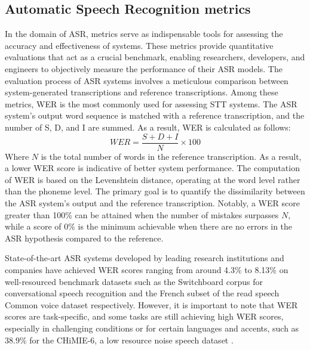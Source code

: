 \subsection{Automatic Speech Recognition metrics}%
In the domain of \ac{ASR}, metrics serve as indispensable tools for assessing the accuracy and effectiveness of systems. These metrics provide quantitative evaluations that act as a crucial benchmark, enabling researchers, developers, and engineers to objectively measure the performance of their \ac{ASR} models. The evaluation process of \ac{ASR} systems involves a meticulous comparison between system-generated transcriptions and reference transcriptions. Among these metrics, \ac{WER} is the most commonly used for assessing \ac{STT} systems. The \ac{ASR} system's output word sequence is matched with a reference transcription, and the number of \ac{S}, \ac{D}, and \ac{I} are summed. As a result, \ac{WER} is calculated as follows:
\begin{equation}
    WER = \frac{S  + D +I}{N} \times 100
\end{equation}
Where $N$ is the total number of words in the reference transcription. As a result, a lower \ac{WER} score is indicative of better system performance. The computation of \ac{WER} is based on the Levenshtein distance, operating at the word level rather than the phoneme level. The primary goal is to quantify the dissimilarity between the \ac{ASR} system's output and the reference transcription. Notably, a \ac{WER} score greater than 100\% can be attained when the number of mistakes surpasses $N$, while a score of 0\% is the minimum achievable when there are no errors in the \ac{ASR} hypothesis compared to the reference.

State-of-the-art \ac{ASR} systems developed by leading research institutions and companies have achieved \ac{WER} scores ranging from around 4.3\%  to 8.13\% on well-resourced benchmark datasets such as the Switchboard corpus for conversational speech recognition \cite{tuske2021limit} and the French subset of the read speech Common voice dataset \cite{bermuth2021scribosermo} respectively. However, it is important to note that \ac{WER} scores are task-specific, and some tasks are still achieving high \ac{WER} scores, especially in challenging conditions or for certain languages and accents, such as 38.9\% for the CHiMIE-6, a low resource noise speech dataset \cite{chan2021speechstew}.

